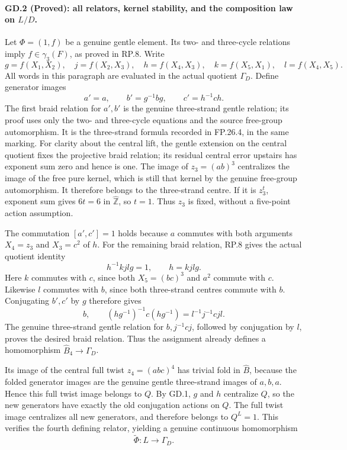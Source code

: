 \paragraph{GD.2 (Proved): all relators, kernel stability, and the composition law on $L/D$.}
Let $\Phi=(1,f)$ be a genuine gentle element. Its
two- and three-cycle relations imply
$f\in\gamma_3(F)$, as proved in RP.8. Write
\[
 g=f(X_1,X_2),\quad j=f(X_2,X_3),\quad
 h=f(X_4,X_3),\quad k=f(X_5,X_1),\quad l=f(X_4,X_5).
\]
All words in this paragraph are evaluated in the
actual quotient $\Gamma_D$. Define generator images
\[
              a'=a,\qquad b'=g^{-1}bg,
                              \qquad c'=h^{-1}ch.
 \tag{GD.2a}
\]
The first braid relation for $a',b'$ is the genuine
three-strand gentle relation; its proof uses only
the two- and three-cycle equations and the source
free-group automorphism. It is the three-strand
formula recorded in FP.26.4, in the same marking.
For clarity about the central lift, the gentle
extension on the central quotient fixes the
projective braid relation; its residual central
error upstairs has exponent sum zero and hence
is one. The image of $z_3=(ab)^3$ centralizes the
image of the free pure kernel, which is still
that kernel by the genuine free-group
automorphism. It therefore belongs to the
three-strand centre. If it is $z_3^t$, exponent
sum gives $6t=6$ in $\widehat{\mathbb Z}$,
so $t=1$. Thus $z_3$ is fixed, without a
five-point action assumption.

The commutation $[a',c']=1$ holds because $a$
commutes with both arguments $X_4=z_3$ and
$X_3=c^2$ of $h$. For the remaining braid relation,
RP.8 gives the actual quotient identity
\[
                   h^{-1}kjlg=1,
                   \qquad h=kjlg.
 \tag{GD.2b}
\]
Here $k$ commutes with $c$, since both $X_5=(bc)^3$
and $a^2$ commute with $c$. Likewise $l$ commutes
with $b$, since both three-strand centres commute
with $b$. Conjugating $b',c'$ by $g$ therefore
gives
\[
       b,\qquad (hg^{-1})^{-1}c(hg^{-1})
                  =l^{-1}j^{-1}cjl.
\]
The genuine three-strand gentle relation for
$b,j^{-1}cj$, followed by conjugation by $l$,
proves the desired braid relation. Thus the
assignment already defines a homomorphism
$\widehat B_4\to\Gamma_D$.

Its image of the central full twist $z_4=(abc)^4$
has trivial fold in $\widehat B$, because the
folded generator images are the genuine gentle
three-strand images of $a,b,a$. Hence this full
twist image belongs to $Q$. By GD.1, $g$ and $h$
centralize $Q$, so the new generators have exactly
the old conjugation actions on $Q$. The full
twist image centralizes all new generators,
and therefore belongs to $Q^L=1$. This verifies
the fourth defining relator, yielding a genuine
continuous homomorphism
\[
                    \widetilde\Phi:L\longrightarrow\Gamma_D.
\]

